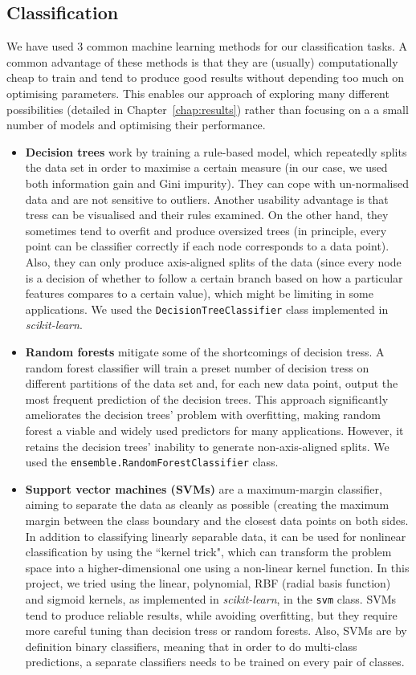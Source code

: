 \documentclass[bsc,frontabs,singlespacing,parskip, twoside]{infthesis}
\begin{document}
\subsection{Classification}
We have used 3 common machine learning methods for our classification tasks. A common advantage of these methods is that they are (usually) computationally cheap to train and tend to produce good results without depending too much on optimising parameters. This enables our approach of exploring many different possibilities (detailed in Chapter~\ref{chap:results}) rather than focusing on a a small number of models and optimising their performance.
\begin{itemize}
	\item \textbf{Decision trees} work by training a rule-based model, which repeatedly splits the data set in order to maximise a certain measure (in our case, we used both information gain and Gini impurity). They can cope with un-normalised data and are not sensitive to outliers. Another usability advantage is that tress can be visualised and their rules examined. On the other hand, they sometimes tend to overfit and produce oversized trees (in principle, every point can be classifier correctly if each node corresponds to a data point). Also, they can only produce axis-aligned splits of the data (since every node is a decision of whether to follow a certain branch based on how a particular features compares to a certain value), which might be limiting in some applications. We used the \texttt{DecisionTreeClassifier} class implemented in \textit{scikit-learn}.
	\item \textbf{Random forests} \cite{breiman2001random} mitigate some of the shortcomings of decision tress. A random forest classifier will train a preset number of decision tress on different partitions of the data set and, for each new data point, output the most frequent prediction of the decision trees. This approach significantly ameliorates the decision trees' problem with overfitting, making random forest a viable and widely used predictors for many applications. However, it retains the decision trees' inability to generate non-axis-aligned splits. We used the \texttt{ensemble.RandomForestClassifier} class.
	\item \textbf{Support vector machines (SVMs)} \cite{cortes1995support} are a maximum-margin classifier, aiming to separate the data as cleanly as possible (creating the maximum margin between the class boundary and the closest data points on both sides. In addition to classifying linearly separable data, it can be used for nonlinear classification by using the ``kernel trick", which can transform the problem space into a higher-dimensional one using a non-linear kernel function. In this project, we tried using the linear, polynomial, RBF (radial basis function) and sigmoid kernels, as implemented in \textit{scikit-learn}, in the \texttt{svm} class. SVMs tend to produce reliable results, while avoiding overfitting, but they require more careful tuning than decision tress or random forests. Also, SVMs are by definition binary classifiers, meaning that in order to do multi-class predictions, a separate classifiers needs to be trained on every pair of classes.
\end{itemize}
\end{document}
